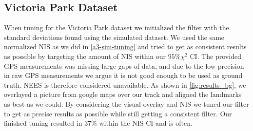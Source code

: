 \subsection{Victoria Park Dataset}
When tuning for the Victoria Park dataset we initialized the filter with the standard deviations found using the simulated dataset. We used the same normalized NIS as we did in \cref{a3-sim-tuning} and tried to get as consistent results as possible by targeting the amount of NIS within our $95\% \chi^2$ CI. The provided GPS measurements was missing large gaps of data, and due to the low precision in raw GPS measurements we argue it is not good enough to be used as ground truth. NEES is therefore considered unavailable. As shown in \cref{fig:results_bg}, we overlayed a picture from google maps over our track and aligned the landmarks as best as we could. By considering the visual overlay and NIS we tuned our filter to get as precise results as possible while still getting a consistent filter. Our finished tuning resulted in $37\%$ within the NIS CI and is often.  



